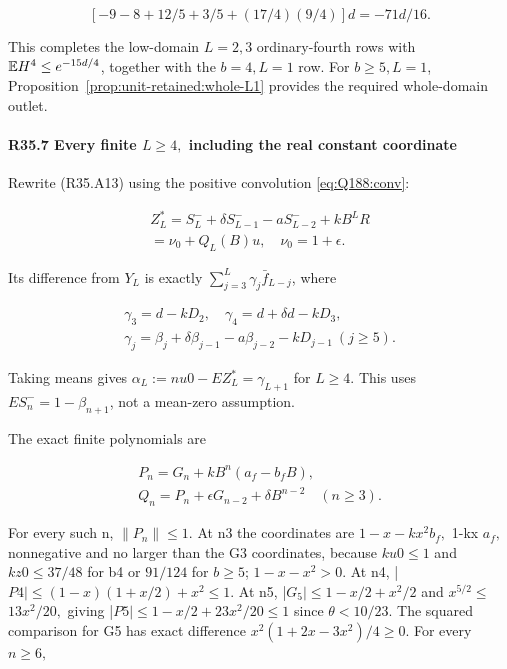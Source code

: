 \[
[-9-8+12/5+3/5+(17/4)(9/4)]d=-71d/16. \tag{R35.A34}
\]

This completes the low-domain $L=2,3$ ordinary-fourth rows with $\mathbb E H^4\le e^{-15d/4}$, together with the $b=4,L=1$ row. For $b\ge5,L=1$, Proposition~\ref{prop:unit-retained:whole-L1} provides the required whole-domain outlet.

\paragraph{R35.7 Every finite \(L\ge 4,\allowbreak \) including the real constant coordinate}

Rewrite (R35.A13) using the positive convolution \eqref{eq:Q188:conv}:

\[
\begin{gathered}
Z_L^*=S_L^-+\delta S_{L-1}^- -aS_{L-2}^-+kB^LR\\
=\nu_0+Q_L(B)u,\quad\nu_0=1+\epsilon.
\end{gathered}
\]

Its difference from \(Y_L\) is exactly \(\sum_{j=3}^L\gamma_j\bar f_{L-j}\), where

\[
\begin{gathered}
\gamma_3=d-kD_2,\quad\gamma_4=d+\delta d-kD_3,\quad\\
\gamma_j=\beta_j+\delta\beta_{j-1}-a\beta_{j-2}-kD_{j-1}\ (j\ge5).
\end{gathered}\tag{R35.A35}
\]

Taking means gives \(\alpha_L:=nu0-EZ_L^*= \gamma_{L+1}\) for \(L\ge 4.\) This uses \(ES_n^-=1- \beta_{n+1}\), not a mean-zero assumption.

The exact finite polynomials are

\[
\begin{gathered}
P_n=G_n+kB^n(a_f-b_fB),\qquad\\
Q_n=P_n+\epsilon G_{n-2}+\delta B^{n-2}\quad(n\ge3).
\end{gathered}\tag{R35.A36}
\]

For every such n, \(\lVert P_n\rVert \le 1.\) At n3 the coordinates are
\(1-x-kx^2b_f,\allowbreak \) 1-kx \(a_f,\allowbreak \) nonnegative and no larger than the G3 coordinates, because \(ku0\le 1\) and \(kz0\le 37/48\) for b4 or \(91/124\) for \(b\ge 5\); \(1-x-x^2>0.\)
At n4,
|\(P4|\le (1-x)(1+x/2)+x^2\le 1.\)
At n5,
|\(G_{5}|\le 1-x/2+x^2/2\) and \(x^{5/2}\)\ensuremath{\le}\(13x^2/20,\allowbreak \) giving
|\(P5|\le 1-x/2+23x^2/20\le 1\) since \(\theta<10/23.\)
The squared comparison for G5 has exact difference \(x^2(1+2x-3x^2)/4\ge 0.\)
For every \(n\ge 6,\allowbreak \)

